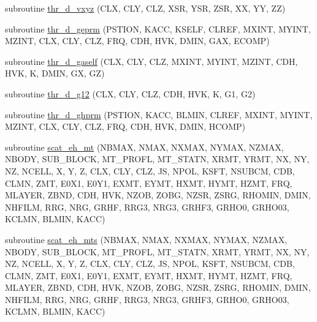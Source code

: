 \begin{DoxyCompactItemize}
\item 
subroutine \hyperlink{Marco_8f90_adcdc2c34804046e9cedb66856cd33a73}{thr\+\_\+d\+\_\+vxyz} (C\+LX, C\+LY, C\+LZ, X\+SR, Y\+SR, Z\+SR, XX, YY, ZZ)
\item 
subroutine \hyperlink{Marco_8f90_a9a9e9c370268b4527247c902f6879e7c}{thr\+\_\+d\+\_\+geprm} (P\+S\+T\+I\+ON, K\+A\+CC, K\+S\+E\+LF, C\+L\+R\+EF, M\+X\+I\+NT, M\+Y\+I\+NT, M\+Z\+I\+NT, C\+LX, C\+LY, C\+LZ, F\+RQ, C\+DH, H\+VK, D\+M\+IN, G\+AX, E\+C\+O\+MP)
\item 
subroutine \hyperlink{Marco_8f90_ae3cfe96a70c91f9cc48038b03b2dbd9b}{thr\+\_\+d\+\_\+gaself} (C\+LX, C\+LY, C\+LZ, M\+X\+I\+NT, M\+Y\+I\+NT, M\+Z\+I\+NT, C\+DH, H\+VK, K, D\+M\+IN, GX, GZ)
\item 
subroutine \hyperlink{Marco_8f90_a64bc8866e9fffd5b13a9903edf4aab07}{thr\+\_\+d\+\_\+g12} (C\+LX, C\+LY, C\+LZ, C\+DH, H\+VK, K, G1, G2)
\item 
subroutine \hyperlink{Marco_8f90_a10048a9736ad8beefbadc2a0bc43f675}{thr\+\_\+d\+\_\+ghprm} (P\+S\+T\+I\+ON, K\+A\+CC, B\+L\+M\+IN, C\+L\+R\+EF, M\+X\+I\+NT, M\+Y\+I\+NT, M\+Z\+I\+NT, C\+LX, C\+LY, C\+LZ, F\+RQ, C\+DH, H\+VK, D\+M\+IN, H\+C\+O\+MP)
\item 
subroutine \hyperlink{Marco_8f90_a5fc5c17c4de06fc14e3e7da23d14dbc0}{scat\+\_\+eh\+\_\+mt} (N\+B\+M\+AX, N\+M\+AX, N\+X\+M\+AX, N\+Y\+M\+AX, N\+Z\+M\+AX, N\+B\+O\+DY, S\+U\+B\+\_\+\+B\+L\+O\+CK, M\+T\+\_\+\+P\+R\+O\+FL, M\+T\+\_\+\+S\+T\+A\+TN, X\+R\+MT, Y\+R\+MT, NX, NY, NZ, N\+C\+E\+LL, X, Y, Z, C\+LX, C\+LY, C\+LZ, JS, N\+P\+OL, K\+S\+FT, N\+S\+U\+B\+CM, C\+DB, C\+L\+MN, Z\+MT, E0\+X1, E0\+Y1, E\+X\+MT, E\+Y\+MT, H\+X\+MT, H\+Y\+MT, H\+Z\+MT, F\+RQ, M\+L\+A\+Y\+ER, Z\+B\+ND, C\+DH, H\+VK, N\+Z\+OB, Z\+O\+BG, N\+Z\+SR, Z\+S\+RG, R\+H\+O\+M\+IN, D\+M\+IN, N\+H\+F\+I\+LM, R\+RG, N\+RG, G\+R\+HF, R\+R\+G3, N\+R\+G3, G\+R\+H\+F3, G\+R\+H\+O0, G\+R\+H\+O03, K\+C\+L\+MN, B\+L\+M\+IN, K\+A\+CC)
\item 
subroutine \hyperlink{Marco_8f90_a5b2af6ff73b05f7fda72228c32b99715}{scat\+\_\+eh\+\_\+mts} (N\+B\+M\+AX, N\+M\+AX, N\+X\+M\+AX, N\+Y\+M\+AX, N\+Z\+M\+AX, N\+B\+O\+DY, S\+U\+B\+\_\+\+B\+L\+O\+CK, M\+T\+\_\+\+P\+R\+O\+FL, M\+T\+\_\+\+S\+T\+A\+TN, X\+R\+MT, Y\+R\+MT, NX, NY, NZ, N\+C\+E\+LL, X, Y, Z, C\+LX, C\+LY, C\+LZ, JS, N\+P\+OL, K\+S\+FT, N\+S\+U\+B\+CM, C\+DB, C\+L\+MN, Z\+MT, E0\+X1, E0\+Y1, E\+X\+MT, E\+Y\+MT, H\+X\+MT, H\+Y\+MT, H\+Z\+MT, F\+RQ, M\+L\+A\+Y\+ER, Z\+B\+ND, C\+DH, H\+VK, N\+Z\+OB, Z\+O\+BG, N\+Z\+SR, Z\+S\+RG, R\+H\+O\+M\+IN, D\+M\+IN, N\+H\+F\+I\+LM, R\+RG, N\+RG, G\+R\+HF, R\+R\+G3, N\+R\+G3, G\+R\+H\+F3, G\+R\+H\+O0, G\+R\+H\+O03, K\+C\+L\+MN, B\+L\+M\+IN, K\+A\+CC)

\end{DoxyCompactItemize}
